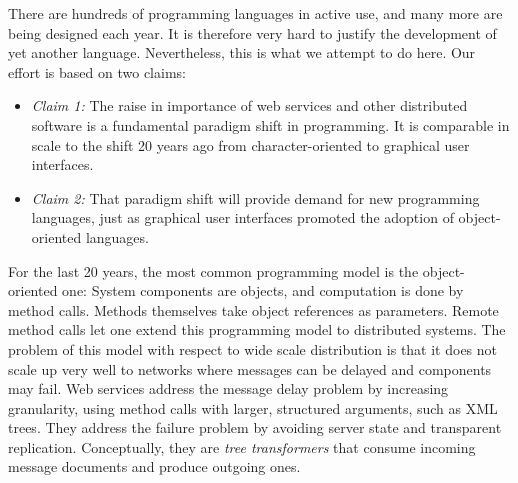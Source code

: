 
There are hundreds of programming languages in active use, and many more are
being designed each year. It is therefore very hard to justify the development
of yet another language. Nevertheless, this is what we attempt to do here. 
Our effort is based on two claims:
\begin{itemize}
\item[] {\em Claim 1:} The raise in importance of web services and
other distributed software is a fundamental paradigm
shift in programming. It is comparable in scale to the shift 20 years ago
from character-oriented to graphical user interfaces.
\item[] {\em Claim 2:} That paradigm shift will provide demand
for new programming languages, just as graphical user interfaces
promoted the adoption of object-oriented languages.
\end{itemize}
For the last 20 years, the most common programming model is the
object-oriented one: System components are objects, and computation is
done by method calls.  Methods themselves take object references as
parameters. Remote method calls let one extend this programming model
to distributed systems. The problem of this model with respect to wide
scale distribution is that it does not scale up very well to networks
where messages can be delayed and components may fail. Web services
address the message delay problem by increasing granularity, using
method calls with larger, structured arguments, such as XML trees.
They address the failure problem by avoiding server state and
transparent replication. Conceptually, they are {\em tree
transformers} that consume incoming message documents and produce outgoing
ones.

